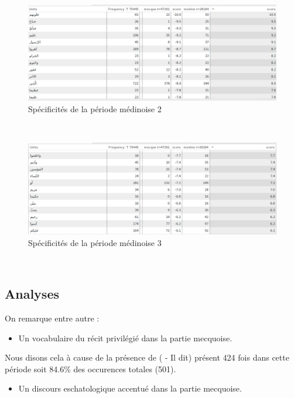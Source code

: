 \documentclass[a4paper,11pt]{report}
\newcommand{\arbt}[1]{{\Large{\arb{#1}}}} %
\begin{document}
\begin{figure}[H]
\centering
\includegraphics[width=.9\linewidth]{./img/spec_medine_2.png}
\caption{Spécificités de la période médinoise 2}
\end{figure} \\

\begin{figure}[H]
\centering
\includegraphics[width=.9\linewidth]{./img/spec_medine_3.png}
\caption{Spécificités de la période médinoise 3}
\end{figure} \\

\subsection{Analyses}
\label{sec-2-2-3}

On remarque entre autre : \\

\begin{itemize}
\item Un vocabulaire du récit privilégié dans la partie mecquoise. \\
\end{itemize}

Nous disons cela à cause de la présence de (\arbt{قال} - Il dit) présent 424 fois dans cette période soit 84.6\% des occurences totales (501). \\

\begin{itemize}
\item Un discours eschatologique accentué dans la partie mecquoise. \\
\end{itemize}
\end{document}
